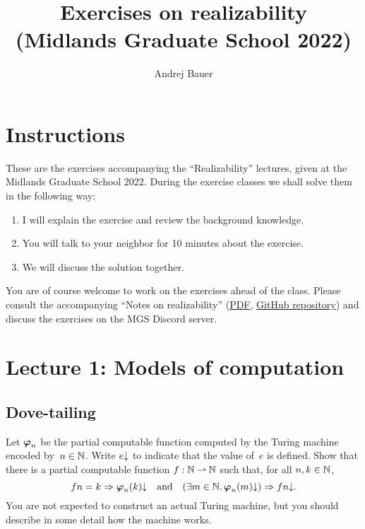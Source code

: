 \documentclass{article}
\title{Exercises on realizability\\
(Midlands Graduate School 2022)}
\author{Andrej Bauer}
\begin{document}
\maketitle

\section*{Instructions}
\label{sec:instructions}

These are the exercises accompanying the ``Realizability'' lectures, given at the Midlands Graduate School 2022.
During the exercise classes we shall solve them in the following way:
%
\begin{enumerate}
\item I will explain the exercise and review the background knowledge.
\item You will talk to your neighbor for 10 minutes about the exercise.
\item We will discuss the solution together.
\end{enumerate}
%
You are of course welcome to work on the exercises ahead of the class. Please consult the accompanying ``Notes on realizability'' (\href{http://www.andrej.com/zapiski/MGS-2022/notes-on-realizability.pdf}{PDF}, \href{https://github.com/andrejbauer/notes-on-realizability}{GitHub repository}) and discuss the exercises on the
MGS Discord server.

\section{Lecture 1: Models of computation}
\label{sec:models-computation}

\subsection{Dove-tailing}
\label{sec:dove-tailing}

Let $\text{\boldmath{$\varphi$}}_n$ be the partial computable function computed by the Turing machine encoded by~$n \in \mathbb{N}$.
Write $e{\downarrow}$ to indicate that the value of~$e$ is defined.
%
Show that there is a partial computable function $f : \mathbb{N} \mathbin{\rightharpoonup} \mathbb{N}$ such that, for all $n, k \in \mathbb{N}$,
%
\begin{equation*}
f n = k \Rightarrow \text{\boldmath{$\varphi$}}_{n}(k){\downarrow}
\quad\text{and}\quad
(\exists m \in \mathbb{N} .\, \text{\boldmath{$\varphi$}}_{n}(m){\downarrow}) \Rightarrow f n{\downarrow}.
\end{equation*}
%
You are not expected to construct an actual Turing machine, but you should describe in some detail how the machine works.
\end{document}
